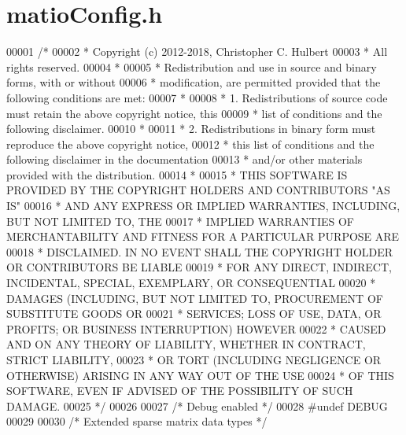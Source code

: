 \hypertarget{matio_config_8h_source}{}\section{matio\+Config.\+h}
\label{matio_config_8h_source}

\begin{DoxyCode}
00001 \textcolor{comment}{/*}
00002 \textcolor{comment}{ * Copyright (c) 2012-2018, Christopher C. Hulbert}
00003 \textcolor{comment}{ * All rights reserved.}
00004 \textcolor{comment}{ *}
00005 \textcolor{comment}{ * Redistribution and use in source and binary forms, with or without}
00006 \textcolor{comment}{ * modification, are permitted provided that the following conditions are met:}
00007 \textcolor{comment}{ *}
00008 \textcolor{comment}{ * 1. Redistributions of source code must retain the above copyright notice, this}
00009 \textcolor{comment}{ *    list of conditions and the following disclaimer.}
00010 \textcolor{comment}{ *}
00011 \textcolor{comment}{ * 2. Redistributions in binary form must reproduce the above copyright notice,}
00012 \textcolor{comment}{ *    this list of conditions and the following disclaimer in the documentation}
00013 \textcolor{comment}{ *    and/or other materials provided with the distribution.}
00014 \textcolor{comment}{ *}
00015 \textcolor{comment}{ * THIS SOFTWARE IS PROVIDED BY THE COPYRIGHT HOLDERS AND CONTRIBUTORS "AS IS"}
00016 \textcolor{comment}{ * AND ANY EXPRESS OR IMPLIED WARRANTIES, INCLUDING, BUT NOT LIMITED TO, THE}
00017 \textcolor{comment}{ * IMPLIED WARRANTIES OF MERCHANTABILITY AND FITNESS FOR A PARTICULAR PURPOSE ARE}
00018 \textcolor{comment}{ * DISCLAIMED. IN NO EVENT SHALL THE COPYRIGHT HOLDER OR CONTRIBUTORS BE LIABLE}
00019 \textcolor{comment}{ * FOR ANY DIRECT, INDIRECT, INCIDENTAL, SPECIAL, EXEMPLARY, OR CONSEQUENTIAL}
00020 \textcolor{comment}{ * DAMAGES (INCLUDING, BUT NOT LIMITED TO, PROCUREMENT OF SUBSTITUTE GOODS OR}
00021 \textcolor{comment}{ * SERVICES; LOSS OF USE, DATA, OR PROFITS; OR BUSINESS INTERRUPTION) HOWEVER}
00022 \textcolor{comment}{ * CAUSED AND ON ANY THEORY OF LIABILITY, WHETHER IN CONTRACT, STRICT LIABILITY,}
00023 \textcolor{comment}{ * OR TORT (INCLUDING NEGLIGENCE OR OTHERWISE) ARISING IN ANY WAY OUT OF THE USE}
00024 \textcolor{comment}{ * OF THIS SOFTWARE, EVEN IF ADVISED OF THE POSSIBILITY OF SUCH DAMAGE.}
00025 \textcolor{comment}{ */}
00026 
00027 \textcolor{comment}{/* Debug enabled */}
00028 \textcolor{preprocessor}{#undef DEBUG}
00029 
00030 \textcolor{comment}{/* Extended sparse matrix data types */}

\end{DoxyCode}
